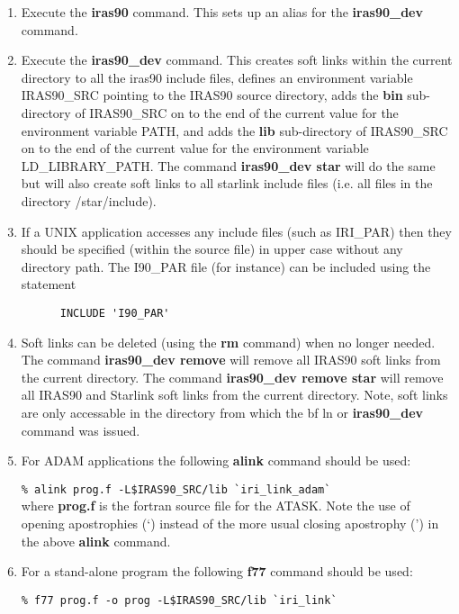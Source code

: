 \begin{enumerate}
\item Execute the {\bf iras90} command. This sets up an alias for the 
{\bf iras90\_dev} command.

\item Execute the {\bf iras90\_dev} command.  This creates soft links
within the current directory to
all the iras90 include files, defines an environment variable IRAS90\_SRC
pointing to the IRAS90 source directory, adds the {\bf bin}
sub-directory of IRAS90\_SRC on to the end of the current value for the
environment variable PATH, and adds the {\bf lib} sub-directory of 
IRAS90\_SRC on to the end of the current value for the environment 
variable LD\_LIBRARY\_PATH. The command {\bf iras90\_dev star} will do
the same but will also create soft links to all starlink include files
(i.e. all files in the directory /star/include).

\item If a UNIX application accesses any include files (such as
IRI\_PAR) then they should be specified (within the source file) in upper case 
without any directory
path. The I90\_PAR file (for instance) can be included using the statement

\verb+      INCLUDE 'I90_PAR'+\\

\item Soft links can be deleted (using the {\bf rm} command) when no longer 
needed.
The command {\bf iras90\_dev remove} will remove all IRAS90 soft links from
the current directory. The command {\bf iras90\_dev remove star} will
remove all IRAS90 and Starlink soft links from the current directory.
Note, soft links are only accessable in the directory from which the {bf ln} 
or {\bf iras90\_dev} command was issued. 
\item For ADAM applications the following {\bf alink} command should be used:

\verb+% alink prog.f -L$IRAS90_SRC/lib `iri_link_adam`+\\

where {\bf prog.f} is the fortran source file for the ATASK.
Note the use of opening apostrophies (`) instead of the more usual closing
apostrophy (') in the above {\bf alink} command.

\item For a stand-alone program the following {\bf f77} command should be used:

\verb+% f77 prog.f -o prog -L$IRAS90_SRC/lib `iri_link`+\\
\end{enumerate}

